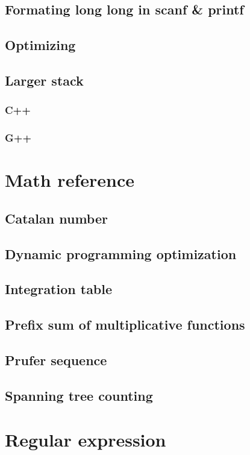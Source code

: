 \documentclass[UTF8,a4paper]{report}
\begin{document}
			\subsection{Formating long long in scanf \& printf}
				
			\subsection{Optimizing}
				
			\subsection{Larger stack}
				\subsubsection{C++}
					
				\subsubsection{G++}
					
		\section{Math reference}
			\subsection{Catalan number}
				
			\subsection{Dynamic programming optimization}
				
			\subsection{Integration table}
				
			\subsection{Prefix sum of multiplicative functions}
				
			\subsection{Prufer sequence}
				
			\subsection{Spanning tree counting}
				
		\section{Regular expression}
				
			
\end{document}
